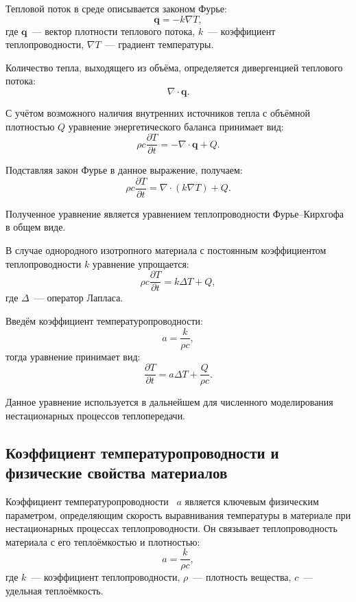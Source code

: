 Тепловой поток в среде описывается законом Фурье:
\begin{equation}
\mathbf{q} = -k \nabla T,
\end{equation}
где $\mathbf{q}$~--- вектор плотности теплового потока, $k$~--- коэффициент теплопроводности, $\nabla T$~--- градиент температуры.

Количество тепла, выходящего из объёма, определяется дивергенцией теплового потока:
\begin{equation}
\nabla \cdot \mathbf{q}.
\end{equation}

С учётом возможного наличия внутренних источников тепла с объёмной плотностью $Q$ уравнение энергетического баланса принимает вид:
\begin{equation}
\rho c \frac{\partial T}{\partial t} = - \nabla \cdot \mathbf{q} + Q.
\end{equation}

Подставляя закон Фурье в данное выражение, получаем:
\begin{equation}
\rho c \frac{\partial T}{\partial t} = \nabla \cdot (k \nabla T) + Q.
\end{equation}

Полученное уравнение является уравнением теплопроводности Фурье--Кирхгофа в общем виде.

В случае однородного изотропного материала с постоянным коэффициентом теплопроводности $k$ уравнение упрощается:
\begin{equation}
\rho c \frac{\partial T}{\partial t} = k \Delta T + Q,
\end{equation}
где $\Delta$~--- оператор Лапласа.

Введём коэффициент температуропроводности:
\begin{equation}
a = \frac{k}{\rho c},
\end{equation}
тогда уравнение принимает вид:
\begin{equation}
\frac{\partial T}{\partial t} = a \Delta T + \frac{Q}{\rho c}.
\end{equation}

Данное уравнение используется в дальнейшем для численного моделирования нестационарных процессов теплопередачи.

\subsection{Коэффициент температуропроводности и физические свойства материалов}

Коэффициент температуропроводности~\cite{vlasov2004research} $a$ является ключевым физическим 
параметром, определяющим скорость выравнивания температуры в материале 
при нестационарных процессах теплопроводности. Он связывает теплопроводность 
материала с его теплоёмкостью и плотностью:
\begin{equation}
    a = \frac{k}{\rho c},
\end{equation}
где $k$~--- коэффициент теплопроводности, $\rho$~--- 
плотность вещества, $c$~--- удельная теплоёмкость.

